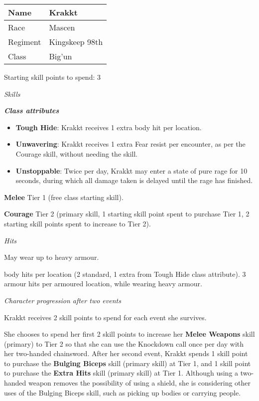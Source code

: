 \documentclass{scrbook}
\begin{document}
\begin{table}
\begin{tabular}{|l|l|} \hline 
Name & Krakkt \\
 \hline Race & Mascen \\
 \hline Regiment & Kingskeep 98th \\
 \hline Class & Big'un \\
 \hline \end{tabular}

\end{table}

Starting skill points to spend: 3

\textit{Skills}

\textbf{\textit{Class attributes}}

\begin{itemize}
\item \textbf{Tough Hide}: Krakkt receives 1 extra body hit per location.

\item \textbf{Unwavering}: Krakkt receives 1 extra Fear resist per encounter, as per the Courage skill, without needing the skill.

\item \textbf{Unstoppable}: Twice per day, Krakkt may enter a state of pure rage for 10 seconds, during which all damage taken is delayed until the rage has finished.

\end{itemize}
\textbf{Melee} Tier 1 (free class starting skill).

\textbf{Courage} Tier 2 (primary skill, 1 starting skill point spent to purchase Tier 1, 2 starting skill points spent to increase to Tier 2).

\textit{Hits}

May wear up to heavy armour.

body hits per location (2 standard, 1 extra from Tough Hide class attribute). 3 armour hits per armoured location, while wearing heavy armour.

\textit{Character progression after two events}

Krakkt receives 2 skill points to spend for each event she survives.

She chooses to spend her first 2 skill points to increase her \textbf{Melee Weapons} skill (primary) to Tier 2 so that she can use the Knockdown call once per day with her two-handed chainsword. After her second event, Krakkt spends 1 skill point to purchase the \textbf{Bulging Biceps} skill (primary skill) at Tier 1, and 1 skill point to purchase the \textbf{Extra Hits} skill (primary skill) at Tier 1. Although using a two-handed weapon removes the possibility of using a shield, she is considering other uses of the Bulging Biceps skill, such as picking up bodies or carrying people.
\end{document}
